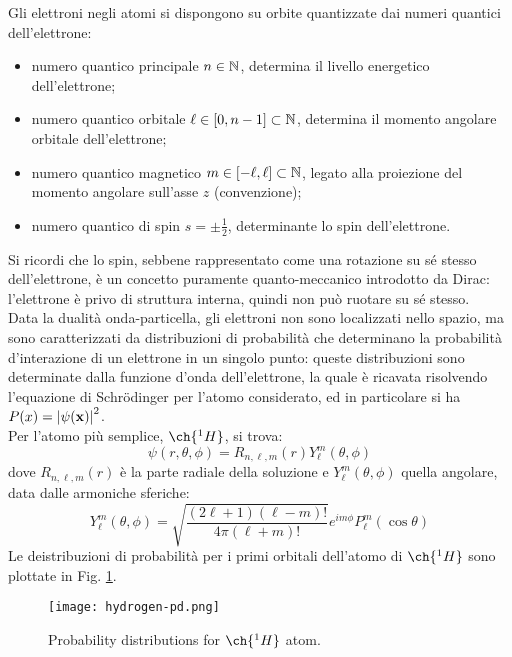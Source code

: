 Gli elettroni negli atomi si dispongono su orbite quantizzate dai numeri quantici dell'elettrone:
\begin{itemize}
	\item numero quantico principale $ n \in \mathbb{N} $, determina il livello energetico dell'elettrone;
	\item numero quantico orbitale $ \ell \in \left[ 0, n-1 \right] \subset \mathbb{N} $, determina il momento angolare orbitale dell'elettrone;
	\item numero quantico magnetico $ m \in \left[ -\ell, \ell \right] \subset \mathbb{N} $, legato alla proiezione del momento angolare sull'asse $ z $ (convenzione);
	\item numero quantico di spin $ s = \pm \frac{1}{2} $, determinante lo spin dell'elettrone.
\end{itemize}
Si ricordi che lo spin, sebbene rappresentato come una rotazione su sé stesso dell'elettrone, è un concetto puramente quanto-meccanico introdotto da Dirac: l'elettrone è privo di struttura interna, quindi non può ruotare su sé stesso.\\
Data la dualità onda-particella, gli elettroni non sono localizzati nello spazio, ma sono caratterizzati da distribuzioni di probabilità che determinano la probabilità d'interazione di un elettrone in un singolo punto: queste distribuzioni sono determinate dalla funzione d'onda dell'elettrone, la quale è ricavata risolvendo l'equazione di Schrödinger per l'atomo considerato, ed in particolare si ha $ P(x) = \left\lvert\psi(\mathbf{x})\right\rvert^2 $.\\
Per l'atomo più semplice, $ \ch{^1 H} $, si trova:
\begin{equation}
	\psi(r,\theta,\phi) = R_{n,\ell,m}(r) Y_{\ell}^m(\theta,\phi)
	\label{eq:1.31}
\end{equation}
dove $ R_{n,\ell,m}(r) $ è la parte radiale della soluzione e $ Y_{\ell}^m(\theta,\phi) $ quella angolare, data dalle armoniche sferiche:
\begin{equation}
	Y_{\ell}^m(\theta,\phi) = \sqrt{\frac{(2\ell+1)(\ell-m)!}{4\pi(\ell+m)!}} e^{im\phi} P_{\ell}^m(\cos\theta)
	\label{eq:1.32}
\end{equation}
Le deistribuzioni di probabilità per i primi orbitali dell'atomo di $ \ch{^1 H} $ sono plottate in Fig. \ref{hyd-pd}.
\begin{figure}
	\centering
	\texttt{[image: hydrogen-pd.png]}
	\caption{Probability distributions for $ \ch{^1 H} $ atom.}
	\label{hyd-pd}
\end{figure}

